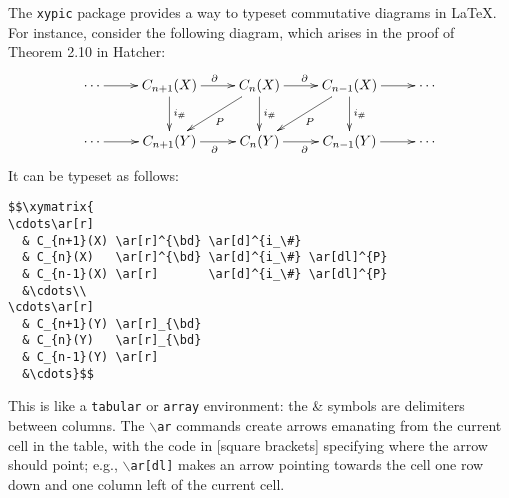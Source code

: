 The \texttt{xypic} package provides a way to typeset commutative diagrams
in LaTeX.  For instance, consider the following
diagram, which arises in the proof of Theorem 2.10 in Hatcher:
$$
\xymatrix{
\cdots\ar[r] & C_{n+1}(X) \ar[r]^{\bd}\ar[d]^{i_\#} & C_{n}(X) \ar[r]^{\bd} \ar[d]^{i_\#} \ar[dl]^{P} & C_{n-1}(X) \ar[r] \ar[d]^{i_\#} \ar[dl]^{P} &\cdots\\
\cdots\ar[r] & C_{n+1}(Y) \ar[r]_{\bd} & C_{n}(Y) \ar[r]_{\bd} & C_{n-1}(Y)\ar[r] &\cdots\\
}$$
It can be typeset as follows:
\begin{verbatim}
$$\xymatrix{
\cdots\ar[r]
  & C_{n+1}(X) \ar[r]^{\bd} \ar[d]^{i_\#}
  & C_{n}(X)   \ar[r]^{\bd} \ar[d]^{i_\#} \ar[dl]^{P}
  & C_{n-1}(X) \ar[r]       \ar[d]^{i_\#} \ar[dl]^{P}
  &\cdots\\
\cdots\ar[r]
  & C_{n+1}(Y) \ar[r]_{\bd}
  & C_{n}(Y)   \ar[r]_{\bd}
  & C_{n-1}(Y) \ar[r]
  &\cdots}$$
\end{verbatim}
This is like a \texttt{tabular} or \texttt{array} environment:
the \& symbols are delimiters between columns.  The $\backslash$\texttt{ar}
commands create arrows emanating from the current cell in the table, with
the code in [square brackets] specifying where the arrow should point;
e.g., \texttt{$\backslash$ar[dl]} makes an arrow pointing towards the
cell one row down and one column left of the current cell.




